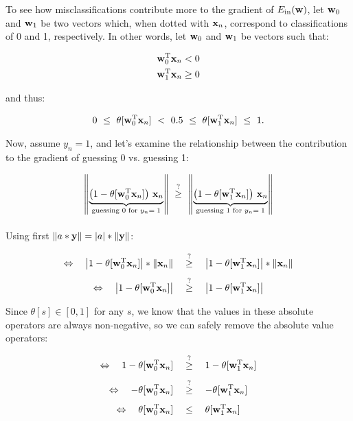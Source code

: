 To see how misclassifications contribute more to the gradient of
$E_{\text{in}}(\mathbf{w})$, let $\mathbf{w}_0$ and $\mathbf{w}_1$ be two vectors which, when
dotted with $\mathbf{x}_n$, correspond to classifications of 0 and 1, respectively.
In other words, let $\mathbf{w}_0$ and $\mathbf{w}_1$ be vectors such that:

\begin{align*}
  \mathbf{w}_0^{\text{T}} \mathbf{x}_n &< 0\\
  \mathbf{w}_1^{\text{T}} \mathbf{x}_n &\geq 0
\end{align*}

and thus:

\begin{align}
  0\ \leq\ \theta[\wztx]\ <\ 0.5\ \leq\ \theta[\wotx]\ \leq\ 1.\label{eq:thetas}
\end{align}

Now, assume $y_n = 1$, and let's examine the relationship between the
contribution to the gradient of guessing 0 vs. guessing 1:

\begin{alignat*}{2}
  \norm{\underbrace{\big(1 - \theta[\wzt \mbf x_n]\big)\ \mbf x_n
  }_{\text{guessing 0 for } y_n =\; 1}}\ &\mygeq\ \norm{\underbrace{\big(1 - \theta[\wot \mbf
  x_n]\big)\ \mbf x_n}_{\text{guessing 1 for } y_n =\; 1}}\\[4pt]
\end{alignat*}

Using first $\lVert a * \mathbf{y}\rVert = |a| * \lVert \mathbf{y} \rVert$:

\begin{alignat*}{2}
  \Leftrightarrow\quad\left|1 - \theta[\mathbf{w}_0^{\text{T}} \mathbf{x}_n]\right| * \left\lVert\mathbf{x}_n
  \right\rVert\quad &\mathrel{\mathop{\geq}\limits^{?}}\quad \left|1 - \theta[\mathbf{w}_1^{\text{T}} \mathbf{x}_n]\right| *\left\lVert\mathbf{x}_n\right\rVert\\[4pt]
  \Leftrightarrow\quad\left|1 - \theta[\mathbf{w}_0^{\text{T}} \mathbf{x}_n]\right| \quad &\mathrel{\mathop{\geq}\limits^{?}}\quad \left|1 - \theta[\mathbf{w}_1^{\text{T}} \mathbf{x}_n]\right|
\end{alignat*}

Since $\theta[s] \in [0, 1]$ for any $s$, we know that the values
in these absolute operators are always non-negative, so we can safely remove the
absolute value operators:

\begin{align*}
  \Leftrightarrow\quad1 - \theta[\mathbf{w}_0^{\text{T}} \mathbf{x}_n] \quad &\mathrel{\mathop{\geq}\limits^{?}}\quad
  1 - \theta[\mathbf{w}_1^{\text{T}} \mathbf{x}_n]\\[4pt]
  \Leftrightarrow\quad- \theta[\mathbf{w}_0^{\text{T}} \mathbf{x}_n] \quad &\mathrel{\mathop{\geq}\limits^{?}}\quad
  - \theta[\mathbf{w}_1^{\text{T}} \mathbf{x}_n]\\[4pt]
  \Leftrightarrow\quad \theta[\mathbf{w}_0^{\text{T}} \mathbf{x}_n] \quad &\leq\quad
  \theta[\mathbf{w}_1^{\text{T}} \mathbf{x}_n]
\end{align*}

